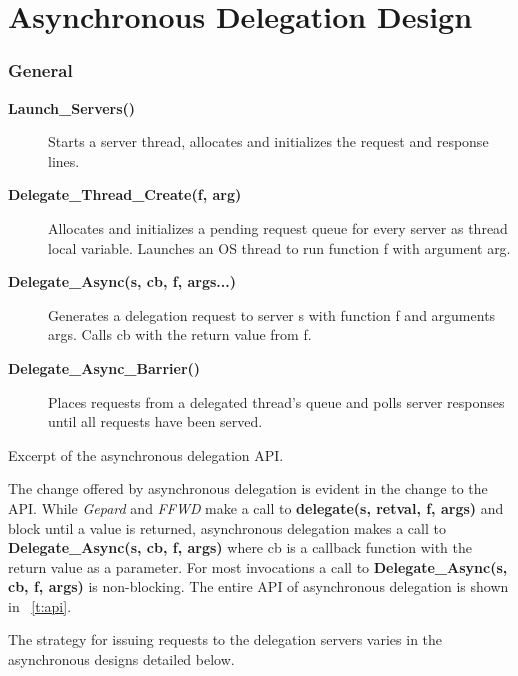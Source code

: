 \documentclass{uicthesi}
\begin{document}
\chapter{Asynchronous Delegation Design}
\subsection{General}
\begin{table}\small
  \begin{description}
  \item[\bf Launch\_Servers()] Starts a server thread, allocates and initializes the request and response lines.
  \item[\bf Delegate\_Thread\_Create(f, arg)] Allocates and initializes a pending request queue for every server as thread local variable. Launches an OS thread to run function f with argument arg.   
  \item[\bf Delegate\_Async(s, cb, f, args...)]  Generates a delegation request to server s with function f and arguments args. Calls cb with the return value from f.
  \item[\bf Delegate\_Async\_Barrier()] Places requests from a delegated thread's queue and polls server responses until all requests have been served. 
\end{description}
\caption{Excerpt of the asynchronous delegation API. }
\label{t:api}
\end{table}

The change offered by asynchronous delegation is evident in the change to the API. While \textit{Gepard} and \textit{FFWD} make a call to \textbf{delegate(s, retval, f, args)} and block until a value is returned, asynchronous delegation makes a call to \textbf{Delegate\_Async(s, cb, f, args)} where cb is a callback function with the return value as a parameter. For most invocations a call to \textbf{Delegate\_Async(s, cb, f, args)} is non-blocking. 
The entire API of asynchronous delegation is shown in ~\ref{t:api}. 

The strategy for issuing requests to the delegation servers varies in the asynchronous designs detailed below. 
\end{document}
